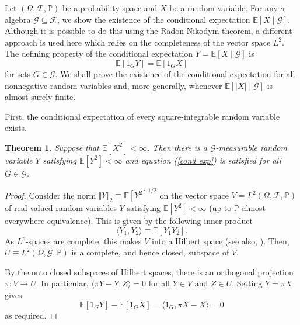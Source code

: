 \documentclass[12pt]{article}
\newtheorem{theorem}{Theorem}
\begin{document}

Let $(\Omega,\mathcal{F},\mathbb{P})$ be a probability space and $X$ be a random variable. For any $\sigma$-algebra $\mathcal{G}\subseteq\mathcal{F}$, we show the existence of the conditional expectation $\mathbb{E}[X\mid\mathcal{G}]$. Although it is possible to do this using the Radon-Nikodym theorem, a different approach is used here which relies on the completeness of the vector space $L^2$.
The defining property of the conditional expectation $Y=\mathbb{E}[X\mid\mathcal{G}]$ is
\begin{equation}\label{cond exp}
\mathbb{E}[1_GY]=\mathbb{E}[1_GX]
\end{equation}
for sets $G\in\mathcal{G}$. We shall prove the existence of the conditional expectation for all nonnegative random variables and, more generally, whenever $\mathbb{E}[|X|\mid\mathcal{G}]$ is almost surely finite.

First, the conditional expectation of every square-integrable random variable exists.

\begin{theorem}\label{square integrable}
Suppose that $\mathbb{E}[X^2]<\infty$. Then there is a $\mathcal{G}$-measurable random variable $Y$ satisfying $\mathbb{E}[Y^2]<\infty$ and equation (\ref{cond exp}) is satisfied for all $G\in\mathcal{G}$.
\end{theorem}
\begin{proof}
Consider the norm $\Vert Y\Vert_2\equiv\mathbb{E}[Y^2]^{1/2}$ on the vector space $V=L^2(\Omega,\mathcal{F},\mathbb{P})$ of real valued random variables $Y$ satisfying $\mathbb{E}[Y^2]<\infty$ (up to $\mathbb{P}$ almost everywhere equivalence). This is given by the following inner product
\begin{equation*}
\langle Y_1,Y_2\rangle\equiv\mathbb{E}[Y_1Y_2].
\end{equation*}
As $L^p$-spaces are complete, this makes $V$ into a Hilbert space (see also, ). Then, $U\equiv L^2(\Omega,\mathcal{G},\mathbb{P})$ is a complete, and hence closed, subspace of $V$.

By the  onto closed subspaces of Hilbert spaces, there is an orthogonal projection $\pi\colon V\rightarrow U$. In particular, $\langle\pi Y-Y,Z\rangle=0$ for all $Y\in V$ and $Z\in U$. Setting $Y=\pi X$ gives
\begin{equation*}
\mathbb{E}[1_GY]-\mathbb{E}[1_GX] = \langle 1_G,\pi X-X\rangle=0
\end{equation*}
as required.
\end{proof}
\end{document}

